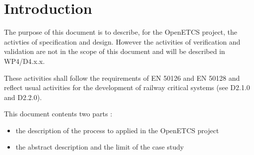 \documentclass{template/openetcs_article}
\begin{document}
\newenvironment{issue}{
	\begin{quote}
	\begin{itshape}Open Issue. 
}{
	\end{itshape}
	\end{quote}
}

\newenvironment{comment}{
	\begin{quote}
	\begin{itshape}Comment. 
}{
	\end{itshape}
	\end{quote}
}

\newenvironment{justif}{
	\begin{quote}
	\begin{itshape}Justification. 
}{
	\end{itshape}
	\end{quote}
}


\def\reqt{R-WP2/D2.3.0}
\section{Introduction}

The purpose of this document is to describe, for the OpenETCS project, the activties of specification and design. However the activities of verification and validation are not in the scope of this document and will be described in WP4/D4.x.x.

These activities shall follow the requirements of EN 50126 and EN 50128 and reflect usual activities for the development of railway critical systems (see D2.1.0  and D2.2.0).

This document  contents two parts :
\begin{itemize}
\item the description of the process to applied in the OpenETCS project
\item the abstract description and the limit of the case study 
\end{itemize}
\end{document}
